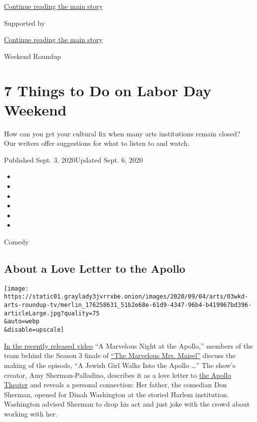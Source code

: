 \protect\hyperlink{after-top}{Continue reading the main story}

Supported by

\protect\hyperlink{after-sponsor}{Continue reading the main story}

Weekend Roundup

\hypertarget{7-things-to-do-on-labor-day-weekend}{%
\section{7 Things to Do on Labor Day
Weekend}\label{7-things-to-do-on-labor-day-weekend}}

How can you get your cultural fix when many arts institutions remain
closed? Our writers offer suggestions for what to listen to and watch.

Published Sept. 3, 2020Updated Sept. 6, 2020

\begin{itemize}
\item
\item
\item
\item
\item
\item
\end{itemize}

Comedy

\hypertarget{about-a-love-letter-to-the-apollo}{%
\subsection{About a Love Letter to the
Apollo}\label{about-a-love-letter-to-the-apollo}}

\texttt{[image: https://static01.graylady3jvrrxbe.onion/images/2020/09/04/arts/03wkd-arts-roundup-tv/merlin\_176258631\_51b2e68e-61d9-4347-96b4-b419967bd396-articleLarge.jpg?quality=75\\\&auto=webp\\\&disable=upscale]}

\href{https://www.youtube.com/watch?v=L17urNKitwk}{In the recently
released video} ``A Marvelous Night at the Apollo,'' members of the team
behind the Season 3 finale of
\href{https://www.amazon.com/Marvelous-Mrs-Maisel-Season/dp/B06VYH1GF7}{``The
Marvelous Mrs. Maisel''} discuss the making of the episode, ``A Jewish
Girl Walks Into the Apollo \ldots{}'' The show's creator, Amy
Sherman-Palladino, describes it as a love letter to
\href{https://www.apollotheater.org/}{the Apollo Theater} and reveals a
personal connection: Her father, the comedian Don Sherman, opened for
Dinah Washington at the storied Harlem institution. Washington advised
Sherman to drop his act and just joke with the crowd about working with
her.

